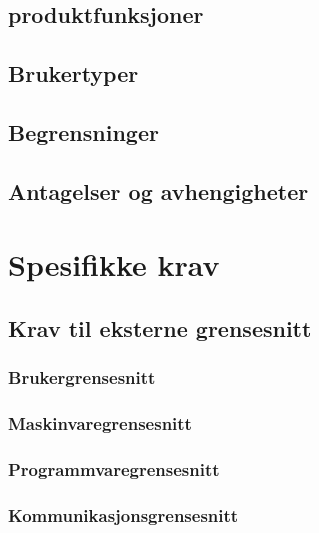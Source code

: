 \documentclass[a4paper, 12pt]{article}
\begin{document}
\subsection{produktfunksjoner}

\subsection{Brukertyper}

\subsection{Begrensninger}

\subsection{Antagelser og avhengigheter}

\section{Spesifikke krav}

\subsection{Krav til eksterne grensesnitt}

\subsubsection{Brukergrensesnitt}

\subsubsection{Maskinvaregrensesnitt}

\subsubsection{Programmvaregrensesnitt}

\subsubsection{Kommunikasjonsgrensesnitt}
\end{document}
